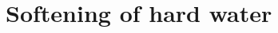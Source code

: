 \documentclass{book}
\begin{document}
 


\newcommand\chapterlabel{}\newcommand\ChapterNameLabel{}\newcommand\labname{}\newcommand\chapterpathtocontent{}\newcommand\chapterpathtoimages{}\newcommand\chapterpath{} 

\section{Softening of hard water}
\renewcommand\chapterlabel{Ch-solutions}\renewcommand\ChapterNameLabel{\chapterlabel}\renewcommand\labname{hardwater}\renewcommand\chapterpathtocontent{../../}\renewcommand\chapterpathtoimages{\chapterpathtocontent}\renewcommand\chapterpath{../../\chapterlabel/LAB-\labname/}
\end{document}
